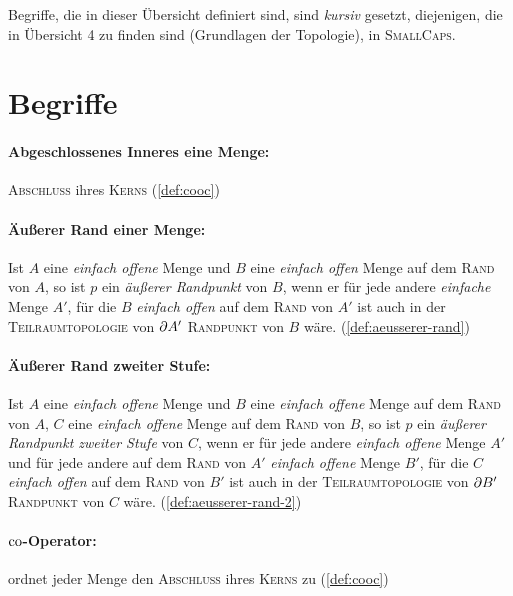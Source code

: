 

\newcommand{\overviewnumber}{5}
\newcommand{\overviewname}{Weitere topologische Begriffe}



\noindent
Begriffe, die in dieser Übersicht definiert sind, sind \textit{kursiv} gesetzt, diejenigen, die in Übersicht 4 zu finden sind (Grundlagen der Topologie), in \textsc{SmallCaps}.

\section*{Begriffe}

    \paragraph{Abgeschlossenes Inneres eine Menge:} \textsc{Abschluss} ihres \textsc{Kerns} (\ref{def:cooc})
    
    \paragraph{Äußerer Rand einer Menge:} Ist $A$ eine \textit{einfach offene} Menge und $B$ eine \textit{einfach offen} Menge auf dem \textsc{Rand} von $A$, so ist $p$ ein \textit{äußerer Randpunkt} von $B$, wenn er für jede andere \textit{einfache} Menge $A'$, für die $B$ \textit{einfach offen} auf dem \textsc{Rand} von $A'$ ist auch in der \textsc{Teilraumtopologie} von $\partial A'$ \textsc{Randpunkt} von $B$ wäre. (\ref{def:aeusserer-rand})
    
    \paragraph{Äußerer Rand zweiter Stufe:} Ist $A$ eine \textit{einfach offene} Menge und $B$ eine \textit{einfach offene} Menge auf dem \textsc{Rand} von $A$, $C$ eine \textit{einfach offene} Menge auf dem \textsc{Rand} von $B$, so ist $p$ ein \textit{äußerer Randpunkt zweiter Stufe} von $C$, wenn er für jede andere \textit{einfach offene} Menge $A'$ und für jede andere auf dem \textsc{Rand} von $A'$ \textit{einfach offene} Menge $B'$, für die $C$ \textit{einfach offen} auf dem \textsc{Rand} von $B'$ ist auch in der \textsc{Teilraumtopologie} von $\partial B'$ \textsc{Randpunkt} von $C$ wäre.  (\ref{def:aeusserer-rand-2})

    \paragraph{$\text{co}$-Operator:} ordnet jeder Menge den \textsc{Abschluss} ihres \textsc{Kerns} zu (\ref{def:cooc})
    
